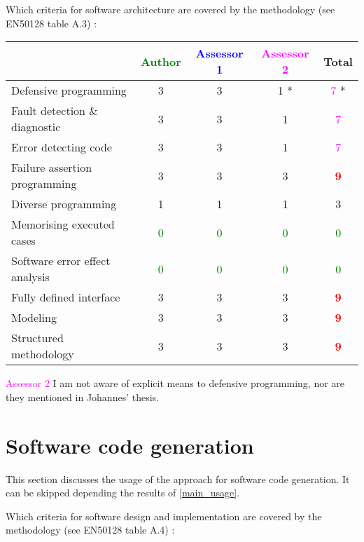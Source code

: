 Which criteria for software architecture are covered by the methodology
(see EN50128 table A.3) :

\begin{tabular}{|l | c | c | c | c|}
\hline
& \textcolor{green}{Author} & \textcolor{blue}{Assessor 1} & \textcolor{magenta}{Assessor 2} & Total \\
\hline
Defensive programming  &3 &3 & 1    *& \textcolor{magenta}{7} * \\
\hline 
Fault detection \& diagnostic  &3 &3 & 1    & \textcolor{magenta}{7} \\
\hline
Error detecting code  &3 &3 & 1    & \textcolor{magenta}{7} \\
\hline
Failure assertion programming &3 &3 & 3    & \textcolor{red}{\textbf{9}} \\
\hline
Diverse programming &1 &1 & 1    & 3     \\
\hline
Memorising executed cases & \textcolor{green}{0}   & \textcolor{green}{0}   & \textcolor{green}{0} & \textcolor{green}{0} \\
\hline
Software error effect analysis & \textcolor{green}{0}   & \textcolor{green}{0}   & \textcolor{green}{0} & \textcolor{green}{0} \\
\hline
Fully defined interface &3 &3 & 3    & \textcolor{red}{\textbf{9}} \\
\hline
Modeling  &3 &3 & 3    & \textcolor{red}{\textbf{9}} \\
\hline
Structured methodology &3 &3 & 3    & \textcolor{red}{\textbf{9}} \\
\hline
\end{tabular}

\textcolor{magenta}{Assessor 2} I am not aware of explicit means to defensive
programming, nor are they mentioned in Johannes' thesis.

\section{Software code generation}
This section discusses the usage of the approach for software code generation.
It can be skipped depending the results of \ref{main_usage}.

Which criteria for software design and implementation are covered by the methodology
(see EN50128 table A.4) :

